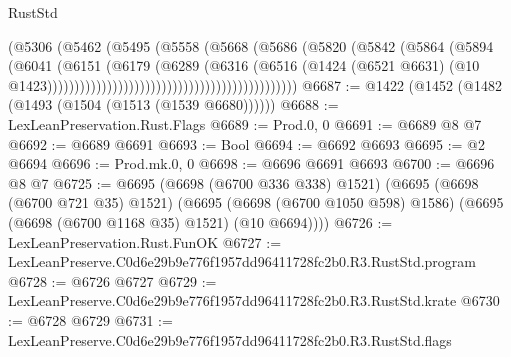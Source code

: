 \begin{lexlean}{RustStd}
\begin{coremodule}
                                                            (@5306
                                                              (@5462
                                                                (@5495
                                                                  (@5558
                                                                    (@5668
                                                                      (@5686
                                                                        (@5820
                                                                          (@5842
                                                                            (@5864
                                                                              (@5894
                                                                                (@6041
                                                                                  (@6151
                                                                                    (@6179
                                                                                      (@6289
                                                                                        (@6316
                                                                                          (@6516
                                                                                            (@1424
                                                                                              (@6521
                                                                                                @6631)
                                                                                              (@10
                                                                                                @1423))))))))))))))))))))))))))))))))))))))))))))))
@6687 := @1422 (@1452 (@1482 (@1493 (@1504 (@1513 (@1539 @6680))))))
@6688 := LexLeanPreservation.Rust.Flags
@6689 := Prod.{0, 0}
@6691 := @6689 @8 @7
@6692 := @6689 @6691
@6693 := Bool
@6694 := @6692 @6693
@6695 := @2 @6694
@6696 := Prod.mk.{0, 0}
@6698 := @6696 @6691 @6693
@6700 := @6696 @8 @7
@6725 := @6695
    (@6698 (@6700 @336 @338) @1521)
    (@6695
      (@6698 (@6700 @721 @35) @1521)
      (@6695 (@6698 (@6700 @1050 @598) @1586) (@6695 (@6698 (@6700 @1168 @35) @1521) (@10 @6694))))
@6726 := LexLeanPreservation.Rust.FunOK
@6727 := LexLeanPreserve.C0d6e29b9e776f1957dd96411728fc2b0.R3.RustStd.program
@6728 := @6726 @6727
@6729 := LexLeanPreserve.C0d6e29b9e776f1957dd96411728fc2b0.R3.RustStd.krate
@6730 := @6728 @6729
@6731 := LexLeanPreserve.C0d6e29b9e776f1957dd96411728fc2b0.R3.RustStd.flags

\end{coremodule}
\end{lexlean}
